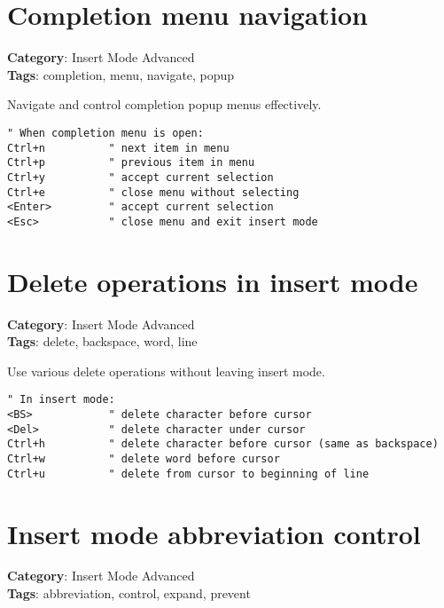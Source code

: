 {{{{{{\section{Completion menu navigation}

\textbf{Category}: Insert Mode Advanced\\ \textbf{Tags}: completion, menu, navigate, popup
\vspace{0.5cm}

Navigate and control completion popup menus effectively.

\begin{Exa*}{}
\begin{Verbatim}[fontsize=\footnotesize, breaklines, breakanywhere]
" When completion menu is open:
Ctrl+n          " next item in menu
Ctrl+p          " previous item in menu
Ctrl+y          " accept current selection
Ctrl+e          " close menu without selecting
<Enter>         " accept current selection
<Esc>           " close menu and exit insert mode
\end{Verbatim}
\end{Exa*}

\section{Delete operations in insert mode}

\textbf{Category}: Insert Mode Advanced\\ \textbf{Tags}: delete, backspace, word, line
\vspace{0.5cm}

Use various delete operations without leaving insert mode.

\begin{Exa*}{}
\begin{Verbatim}[fontsize=\footnotesize, breaklines, breakanywhere]
" In insert mode:
<BS>            " delete character before cursor
<Del>           " delete character under cursor
Ctrl+h          " delete character before cursor (same as backspace)
Ctrl+w          " delete word before cursor
Ctrl+u          " delete from cursor to beginning of line
\end{Verbatim}
\end{Exa*}

\section{Insert mode abbreviation control}

\textbf{Category}: Insert Mode Advanced\\ \textbf{Tags}: abbreviation, control, expand, prevent
\vspace{0.5cm}

}}}}}}
